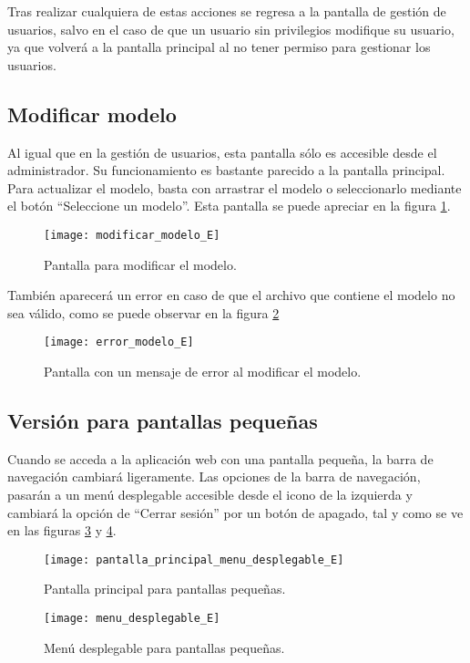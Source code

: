 Tras realizar cualquiera de estas acciones se regresa a la pantalla de gestión de usuarios, salvo en el caso de que un usuario sin privilegios modifique su usuario, ya que volverá a la pantalla principal al no tener permiso para gestionar los usuarios.

\subsection{Modificar modelo}
Al igual que en la gestión de usuarios, esta pantalla sólo es accesible desde el administrador. Su funcionamiento es bastante parecido a la pantalla principal. Para actualizar el modelo, basta con arrastrar el modelo o seleccionarlo mediante el botón ``Seleccione un modelo''. Esta pantalla se puede apreciar en la figura \ref{fig:modificar_modelo_E}.

\begin{figure}[ht]
	\texttt{[image: modificar\_modelo\_E]}
	\caption{Pantalla para modificar el modelo.}
	\label{fig:modificar_modelo_E}
\end{figure}

También aparecerá un error en caso de que el archivo que contiene el modelo no sea válido, como se puede observar en la figura \ref{fig:error_modelo_E}

\begin{figure}[ht]
	\texttt{[image: error\_modelo\_E]}
	\caption{Pantalla con un mensaje de error al modificar el modelo.}
	\label{fig:error_modelo_E}
\end{figure}

\subsection{Versión para pantallas pequeñas}
Cuando se acceda a la aplicación web con una pantalla pequeña, la barra de navegación cambiará ligeramente. Las opciones de la barra de navegación, pasarán a un menú desplegable accesible desde el icono de la izquierda y cambiará la opción de ``Cerrar sesión'' por un botón de apagado, tal y como se ve en las figuras \ref{fig:pantalla_principal_menu_desplegable_E} y \ref{fig:menu_desplegable_E}.

\begin{figure}[ht]
	\texttt{[image: pantalla\_principal\_menu\_desplegable\_E]}
	\caption{Pantalla principal para pantallas pequeñas.}
	\label{fig:pantalla_principal_menu_desplegable_E}
\end{figure}

\begin{figure}[ht]
	\texttt{[image: menu\_desplegable\_E]}
	\caption{Menú desplegable para pantallas pequeñas.}
	\label{fig:menu_desplegable_E}
\end{figure}
